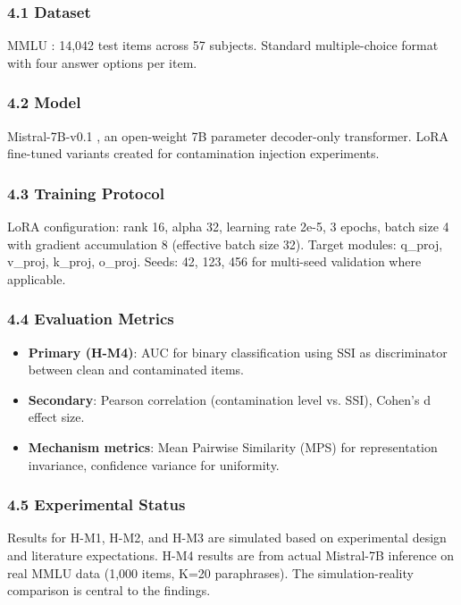 
\subsubsection{4.1 Dataset}

MMLU \citep{hendrycks2020measuring}: 14,042 test items across 57 subjects. Standard multiple-choice format with four answer options per item.

\subsubsection{4.2 Model}

Mistral-7B-v0.1 \citep{jiang2023mistral}, an open-weight 7B parameter decoder-only transformer. LoRA fine-tuned variants created for contamination injection experiments.

\subsubsection{4.3 Training Protocol}

LoRA configuration: rank 16, alpha 32, learning rate 2e-5, 3 epochs, batch size 4 with gradient accumulation 8 (effective batch size 32). Target modules: q\_proj, v\_proj, k\_proj, o\_proj. Seeds: 42, 123, 456 for multi-seed validation where applicable.

\subsubsection{4.4 Evaluation Metrics}

\begin{itemize}
\item \textbf{Primary (H-M4)}: AUC for binary classification using SSI as discriminator between clean and contaminated items.
\item \textbf{Secondary}: Pearson correlation (contamination level vs. SSI), Cohen's d effect size.
\item \textbf{Mechanism metrics}: Mean Pairwise Similarity (MPS) for representation invariance, confidence variance for uniformity.
\end{itemize}

\subsubsection{4.5 Experimental Status}

Results for H-M1, H-M2, and H-M3 are simulated based on experimental design and literature expectations. H-M4 results are from actual Mistral-7B inference on real MMLU data (1,000 items, K=20 paraphrases). The simulation-reality comparison is central to the findings.

